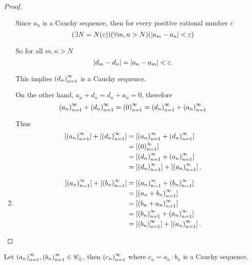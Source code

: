 \begin{proof}
\begin{enumerate}[label={(F\arabic*)},itemsep=0pt]
              Since $a_{n}$ is a Cauchy sequence, then for every positive rational number $\varepsilon$
              \[
                  (\exists N=N(\varepsilon))(\forall m, n > N)(\left\vert{a_{m} - a_{n}}\right\vert < \varepsilon)
              \]

              So for all $m, n > N$
              \[
                  \left\vert{d_{m} - d_{n}}\right\vert = \left\vert{a_{n} - a_{m}}\right\vert < \varepsilon.
              \]

              This implies ${\left({d_{n}}\right)}^{\infty}_{n=1}$ is a Cauchy sequence.

              On the other hand, $a_{n} + d_{n} = d_{n} + a_{n} = 0$, therefore
              \[
                  {\left({a_{n}}\right)}^{\infty}_{n=1} + {\left({d_{n}}\right)}^{\infty}_{n=1} = {\left({0}\right)}^{\infty}_{n=1} = {\left({d_{n}}\right)}^{\infty}_{n=1} + {\left({a_{n}}\right)}^{\infty}_{n=1}
              \]

              Thus
              \begin{align*}
                  \left[{{\left({a_{n}}\right)}^{\infty}_{n=1}}\right] + \left[{{\left({d_{n}}\right)}^{\infty}_{n=1}}\right] & = \left[{{\left({a_{n}}\right)}^{\infty}_{n=1} + {\left({d_{n}}\right)}^{\infty}_{n=1}}\right]          \\
                                                            & = \left[{{\left({0}\right)}^{\infty}_{n=1}}\right]                            \\
                                                            & = \left[{{\left({d_{n}}\right)}^{\infty}_{n=1} + {\left({a_{n}}\right)}^{\infty}_{n=1}}\right]          \\
                                                            & = \left[{{\left({d_{n}}\right)}^{\infty}_{n=1}}\right] + \left[{{\left({a_{n}}\right)}^{\infty}_{n=1}}\right].
              \end{align*}
        \item \begin{align*}
                  \left[{{\left({a_{n}}\right)}^{\infty}_{n=1}}\right] + \left[{{\left({b_{n}}\right)}^{\infty}_{n=1}}\right] & = \left[{{\left({a_{n}}\right)}^{\infty}_{n=1} + {\left({b_{n}}\right)}^{\infty}_{n=1}}\right]                  \\
                                                            & = \left[{{\left({a_{n} + b_{n}}\right)}^{\infty}_{n=1}}\right]                        \\
                                                            & = \left[{{\left({b_{n} + a_{n}}\right)}^{\infty}_{n=1}}\right]                        \\
                                                            & = \left[{{\left({b_{n}}\right)}^{\infty}_{n=1} + {\left({a_{n}}\right)}^{\infty}_{n=1}}\right]                  \\
                                                            & = \left[{{\left({b_{n}}\right)}^{\infty}_{n=1}}\right] + \left[{{\left({a_{n}}\right)}^{\infty}_{n=1}}\right].\qedhere
              \end{align*}
    \end{enumerate}
\end{proof}

\begin{theorem}\label{theorem:chapter1:product-of-cauchy-sequences}
    Let ${\left({a_{n}}\right)}^{\infty}_{n=1}, {\left({b_{n}}\right)}^{\infty}_{n=1}\in\mathscr{C}_{\mathbb{Q}}$, then ${\left({c_{n}}\right)}^{\infty}_{n=1}$ where $c_{n} = a_{n} \cdot b_{n}$ is a Cauchy sequence.
\end{theorem}

